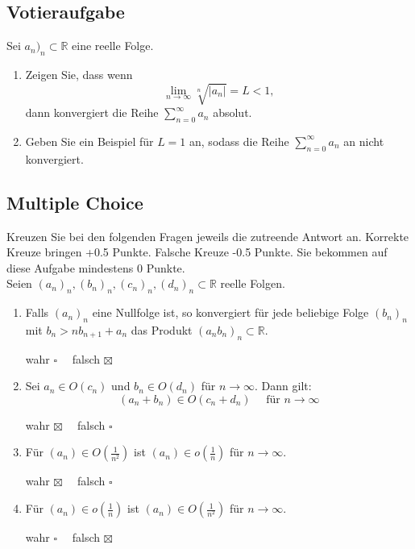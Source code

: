 \documentclass[a4paper]{article}
\begin{document}
\setcounter{section}{5}
\subsection{Votieraufgabe}
Sei $a_n)_n \subset \mathbb{R}$ eine reelle Folge.
\begin{enumerate}[label=(\alph*)]
    \item Zeigen Sie, dass wenn
    \[\lim\limits_{n\to\infty}\sqrt[n]{|a_n|}=L<1,\]
    dann konvergiert die Reihe $\sum\limits^\infty_{n=0}a_n$ absolut.
    \item Geben Sie ein Beispiel für $L = 1$ an, sodass die Reihe $\sum\limits^\infty_{n=0}a_n$ an nicht konvergiert.
\end{enumerate}
\subsection{Multiple Choice}
Kreuzen Sie bei den folgenden Fragen jeweils die zutreende Antwort an. Korrekte Kreuze bringen +0.5 Punkte. Falsche Kreuze -0.5 Punkte. Sie bekommen auf diese Aufgabe mindestens 0 Punkte.\\
Seien $(a_n)_n, (b_n)_n, (c_n)_n, (d_n)_n \subset \mathbb{R}$ reelle Folgen.
\begin{enumerate}[label=(\alph*)]
    \item Falls $(a_n)_n$ eine Nullfolge ist, so konvergiert für jede beliebige Folge $(b_n)_n$ mit $b_n > nb_{n+1} + a_n$ das Produkt $(a_nb_n)_n \subset \mathbb{R}$.
    \begin{flushright}
        wahr $\square\quad$ falsch $\boxtimes$
    \end{flushright}
    \item Sei $a_n \in O(c_n)$ und $b_n \in O(d_n)$ für $n\to\infty$. Dann gilt:
    \[(a_n+b_n)\in O(c_n+d_n)\quad \text{ für } n\to\infty\]
    \begin{flushright}
        wahr $\boxtimes\quad$ falsch $\square$
    \end{flushright}
    \item Für $(a_n) \in O\left(\frac{1}{n^2}\right)$ ist $(a_n)\in o\left(\frac{1}{n}\right)$ für $n\to\infty$.
    \begin{flushright}
        wahr $\boxtimes\quad$ falsch $\square$
    \end{flushright}
    \item Für $(a_n) \in o\left(\frac{1}{n}\right)$ ist $(a_n) \in O\left(\frac{1}{n^2}\right)$ für $n\to\infty$.   \begin{flushright}
        wahr $\square\quad$ falsch $\boxtimes$
    \end{flushright}
\end{enumerate}
\end{document}
